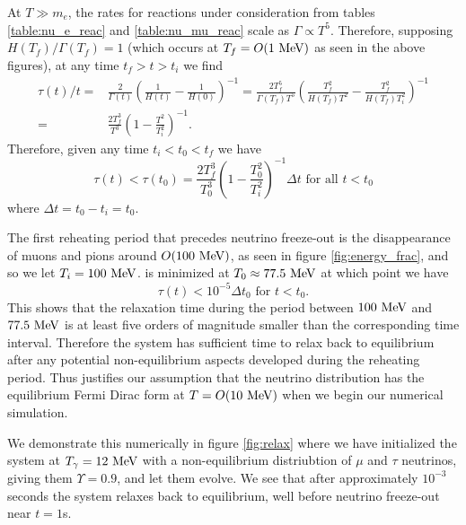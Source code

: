 At $T\gg m_e$, the rates for reactions under consideration from tables \ref{table:nu_e_reac} and \ref{table:nu_mu_reac} scale as $\Gamma\propto T^5$.  Therefore, supposing $H(T_f)/\Gamma(T_f)=1$ (which occurs at $T_f=O(1\text{ MeV})$ as seen in the above figures), at any time $t_f>t>t_i$ we find 
\begin{align}\label{relax_time}
\tau(t)/t=&\frac{2}{\Gamma(t)}\left(\frac{1}{H(t)}-\frac{1}{H(0)}\right)^{-1}=\frac{2T_f^5}{\Gamma(T_f)T^5}\left(\frac{T_f^2}{H(T_f)T^2}-\frac{T_f^2}{H(T_f)T_i^2}\right)^{-1}\\
=&\frac{2T_f^3}{T^3}\left(1-\frac{T^2}{T_i^2}\right)^{-1}.
\end{align}
Therefore, given any time $t_i<t_0<t_f$ we have
\begin{equation}\label{ch6:tau_eq}
\tau(t)<\tau(t_0)=\frac{2T_f^3}{T_0^3}\left(1-\frac{T_0^2}{T_i^2}\right)^{-1}\Delta t \text{ for all } t<t_0
\end{equation}
where $\Delta t=t_0-t_i=t_0$.

 The first reheating period that precedes neutrino freeze-out is the disappearance of muons and pions around $O(100\text{ MeV})$, as seen in figure \ref{fig:energy_frac}, and so we let $T_i=100\text{ MeV}$.  is minimized at $T_0\approx 77.5\text{ MeV}$ at which point we have 
\begin{equation}
\tau(t)<10^{-5} \Delta t_0 \text{ for } t<t_0.
\end{equation}
This shows that the relaxation time during the period between $100\text{ MeV}$ and $77.5\text{ MeV}$ is at least five orders of magnitude smaller than the corresponding time interval.  Therefore the system has sufficient time to relax back to equilibrium after any potential non-equilibrium aspects developed during the reheating period.  Thus justifies our assumption that the neutrino distribution has the equilibrium Fermi Dirac form at $T=O(10 \text{ MeV})$ when we begin our numerical simulation.

We demonstrate this numerically in figure \ref{fig:relax} where we have initialized the system at $T_\gamma=12\text{ MeV}$ with a non-equilibrium distriubtion of $\mu$ and $\tau$ neutrinos, giving them $\Upsilon=0.9$, and let them evolve.  We see that after approximately $10^{-3}$ seconds the system relaxes back to equilibrium, well before neutrino freeze-out near $t=1$s.

